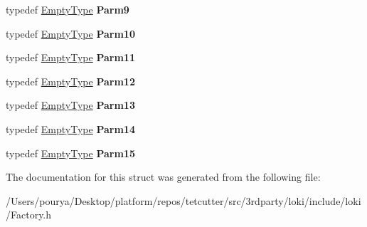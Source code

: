 \begin{DoxyCompactItemize}
\item 
\hypertarget{structLoki_1_1FactoryImplBase_a29296bdc323914c0a556cb11cb801c60}{}typedef \hyperlink{classLoki_1_1EmptyType}{Empty\+Type} {\bfseries Parm9}\label{structLoki_1_1FactoryImplBase_a29296bdc323914c0a556cb11cb801c60}

\item 
\hypertarget{structLoki_1_1FactoryImplBase_aa4b771e7aa9f4021fe5a5bea83535bf6}{}typedef \hyperlink{classLoki_1_1EmptyType}{Empty\+Type} {\bfseries Parm10}\label{structLoki_1_1FactoryImplBase_aa4b771e7aa9f4021fe5a5bea83535bf6}

\item 
\hypertarget{structLoki_1_1FactoryImplBase_a2b9b46e2b9e5eea9a2947b96885472c6}{}typedef \hyperlink{classLoki_1_1EmptyType}{Empty\+Type} {\bfseries Parm11}\label{structLoki_1_1FactoryImplBase_a2b9b46e2b9e5eea9a2947b96885472c6}

\item 
\hypertarget{structLoki_1_1FactoryImplBase_a672d874aa4589ce76103b64992b3c6f9}{}typedef \hyperlink{classLoki_1_1EmptyType}{Empty\+Type} {\bfseries Parm12}\label{structLoki_1_1FactoryImplBase_a672d874aa4589ce76103b64992b3c6f9}

\item 
\hypertarget{structLoki_1_1FactoryImplBase_a466be30fbe59dd00cba9e6cae12cd2b1}{}typedef \hyperlink{classLoki_1_1EmptyType}{Empty\+Type} {\bfseries Parm13}\label{structLoki_1_1FactoryImplBase_a466be30fbe59dd00cba9e6cae12cd2b1}

\item 
\hypertarget{structLoki_1_1FactoryImplBase_aff757d8d7a1fe92db4a6eda0128e5138}{}typedef \hyperlink{classLoki_1_1EmptyType}{Empty\+Type} {\bfseries Parm14}\label{structLoki_1_1FactoryImplBase_aff757d8d7a1fe92db4a6eda0128e5138}

\item 
\hypertarget{structLoki_1_1FactoryImplBase_abbab7d2696c03161a5b066069e79066b}{}typedef \hyperlink{classLoki_1_1EmptyType}{Empty\+Type} {\bfseries Parm15}\label{structLoki_1_1FactoryImplBase_abbab7d2696c03161a5b066069e79066b}

\end{DoxyCompactItemize}


The documentation for this struct was generated from the following file\+:\begin{DoxyCompactItemize}
\item 
/\+Users/pourya/\+Desktop/platform/repos/tetcutter/src/3rdparty/loki/include/loki/Factory.\+h\end{DoxyCompactItemize}
